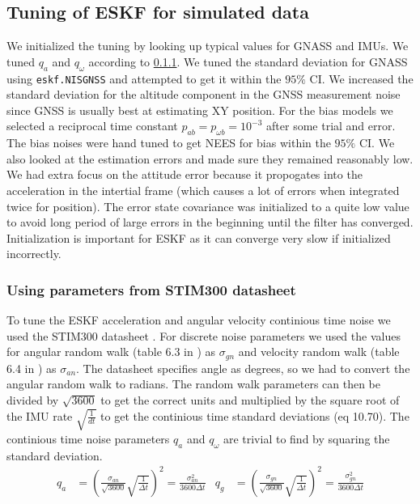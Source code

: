 \subsection{Tuning of ESKF for simulated data}
We initialized the tuning by looking up typical values for GNASS and IMUs. We tuned $q_a$ and $q_\omega$ according to \cref{sec:using_datasheet}. We tuned the standard deviation for GNASS using \texttt{eskf.NISGNSS} and attempted to get it within the $95\%$ CI. We increased the standard deviation for the altitude component in the GNSS measurement noise since GNSS is usually best at estimating XY position. For the bias models we selected a reciprocal time constant $p_{ab} = p_{\omega b} = 10^{-3}$ after some trial and error. The bias noises were hand tuned to get NEES for bias within the $95\%$ CI. We also looked at the estimation errors and made sure they remained reasonably low. We had extra focus on the attitude error because it propogates into the acceleration in the intertial frame (which causes a lot of errors when integrated twice for position). The error state covariance was initialized to a quite low value to avoid long period of large errors in the beginning until the filter has converged. Initialization is important for ESKF as it can  converge very slow if initialized incorrectly.

\subsubsection{Using parameters from STIM300 datasheet}\label{sec:using_datasheet}
To tune the ESKF acceleration and angular velocity continious time noise we used the STIM300 datasheet \cite{stim300}. For discrete noise parameters we used the values for angular random walk (table 6.3 in \cite{stim300}) as $\sigma_{gn}$ and velocity random walk (table 6.4 in \cite{stim300}) as $\sigma_{an}$. 
The datasheet specifies angle as degrees, so we had to convert the angular random walk to radians.
The random walk parameters can then be divided by $\sqrt{3600}$ to get the correct units and multiplied by the square root of the IMU rate $\sqrt{\frac{1}{dt}}$ to get the continious time standard deviations (eq 10.70\cite{edmund}). The continious time noise parameters $q_a$ and $q_\omega$ are trivial to find by squaring the standard deviation.
\begin{align}
q_a &= (\frac{\sigma_{an}}{\sqrt{3600}} \sqrt{\frac{1}{\Delta t}})^2 = \frac{\sigma_{an}^2}{3600 \Delta t} & q_g &= (\frac{\sigma_{gn}}{\sqrt{3600}}\sqrt{\frac{1}{\Delta t}})^2 = \frac{\sigma_{gn}^2}{3600 \Delta t} \label{eq:eskf-cont-noise}
\end{align}


